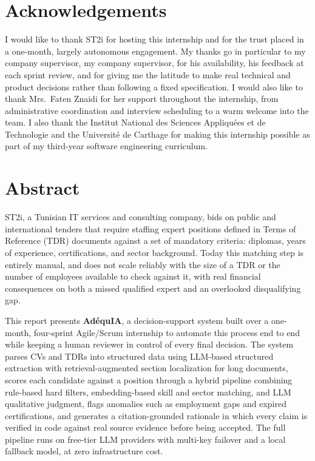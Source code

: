 \documentclass[12pt,a4paper]{report}
\begin{document}




\pagestyle{plain}

\chapter*{Acknowledgements}

I would like to thank ST2i for hosting this internship and for the trust
placed in a one-month, largely autonomous engagement. My thanks go in
particular to my company supervisor, my company supervisor, for his
availability, his feedback at each sprint review, and for giving me the
latitude to make real technical and product decisions rather than
following a fixed specification. I would also like to thank Mrs.\ Faten
Znaidi for her support throughout the internship, from administrative
coordination and interview scheduling to a warm welcome into the team. I
also thank the Institut National des Sciences Appliqu\'ees et de
Technologie and the Universit\'e de Carthage for making this internship
possible as part of my third-year software engineering curriculum.

\chapter*{Abstract}

ST2i, a Tunisian IT services and consulting company, bids on public and
international tenders that require staffing expert positions defined in
Terms of Reference (TDR) documents against a set of mandatory criteria:
diplomas, years of experience, certifications, and sector background.
Today this matching step is entirely manual, and does not scale reliably
with the size of a TDR or the number of employees available to check
against it, with real financial consequences on both a missed qualified
expert and an overlooked disqualifying gap.

This report presents \textbf{AdéquIA}, a decision-support system built
over a one-month, four-sprint Agile/Scrum internship to automate this
process end to end while keeping a human reviewer in control of every
final decision. The system parses CVs and TDRs into structured data using
LLM-based structured extraction with retrieval-augmented section
localization for long documents, scores each candidate against a
position through a hybrid pipeline combining rule-based hard filters,
embedding-based skill and sector matching, and LLM qualitative judgment,
flags anomalies such as employment gaps and expired certifications, and
generates a citation-grounded rationale in which every claim is verified
in code against real source evidence before being accepted. The full
pipeline runs on free-tier LLM providers with multi-key failover and a
local fallback model, at zero infrastructure cost.
\end{document}
